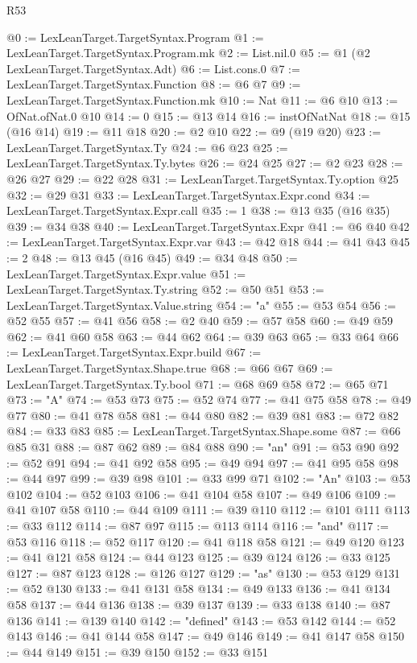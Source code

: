 \begin{lexlean}{R53}
\begin{coremodule}
@0 := LexLeanTarget.TargetSyntax.Program
@1 := LexLeanTarget.TargetSyntax.Program.mk
@2 := List.nil.{0}
@5 := @1 (@2 LexLeanTarget.TargetSyntax.Adt)
@6 := List.cons.{0}
@7 := LexLeanTarget.TargetSyntax.Function
@8 := @6 @7
@9 := LexLeanTarget.TargetSyntax.Function.mk
@10 := Nat
@11 := @6 @10
@13 := OfNat.ofNat.{0} @10
@14 := 0
@15 := @13 @14
@16 := instOfNatNat
@18 := @15 (@16 @14)
@19 := @11 @18
@20 := @2 @10
@22 := @9 (@19 @20)
@23 := LexLeanTarget.TargetSyntax.Ty
@24 := @6 @23
@25 := LexLeanTarget.TargetSyntax.Ty.bytes
@26 := @24 @25
@27 := @2 @23
@28 := @26 @27
@29 := @22 @28
@31 := LexLeanTarget.TargetSyntax.Ty.option @25
@32 := @29 @31
@33 := LexLeanTarget.TargetSyntax.Expr.cond
@34 := LexLeanTarget.TargetSyntax.Expr.call
@35 := 1
@38 := @13 @35 (@16 @35)
@39 := @34 @38
@40 := LexLeanTarget.TargetSyntax.Expr
@41 := @6 @40
@42 := LexLeanTarget.TargetSyntax.Expr.var
@43 := @42 @18
@44 := @41 @43
@45 := 2
@48 := @13 @45 (@16 @45)
@49 := @34 @48
@50 := LexLeanTarget.TargetSyntax.Expr.value
@51 := LexLeanTarget.TargetSyntax.Ty.string
@52 := @50 @51
@53 := LexLeanTarget.TargetSyntax.Value.string
@54 := "a"
@55 := @53 @54
@56 := @52 @55
@57 := @41 @56
@58 := @2 @40
@59 := @57 @58
@60 := @49 @59
@62 := @41 @60 @58
@63 := @44 @62
@64 := @39 @63
@65 := @33 @64
@66 := LexLeanTarget.TargetSyntax.Expr.build
@67 := LexLeanTarget.TargetSyntax.Shape.true
@68 := @66 @67
@69 := LexLeanTarget.TargetSyntax.Ty.bool
@71 := @68 @69 @58
@72 := @65 @71
@73 := "A"
@74 := @53 @73
@75 := @52 @74
@77 := @41 @75 @58
@78 := @49 @77
@80 := @41 @78 @58
@81 := @44 @80
@82 := @39 @81
@83 := @72 @82
@84 := @33 @83
@85 := LexLeanTarget.TargetSyntax.Shape.some
@87 := @66 @85 @31
@88 := @87 @62
@89 := @84 @88
@90 := "an"
@91 := @53 @90
@92 := @52 @91
@94 := @41 @92 @58
@95 := @49 @94
@97 := @41 @95 @58
@98 := @44 @97
@99 := @39 @98
@101 := @33 @99 @71
@102 := "An"
@103 := @53 @102
@104 := @52 @103
@106 := @41 @104 @58
@107 := @49 @106
@109 := @41 @107 @58
@110 := @44 @109
@111 := @39 @110
@112 := @101 @111
@113 := @33 @112
@114 := @87 @97
@115 := @113 @114
@116 := "and"
@117 := @53 @116
@118 := @52 @117
@120 := @41 @118 @58
@121 := @49 @120
@123 := @41 @121 @58
@124 := @44 @123
@125 := @39 @124
@126 := @33 @125
@127 := @87 @123
@128 := @126 @127
@129 := "as"
@130 := @53 @129
@131 := @52 @130
@133 := @41 @131 @58
@134 := @49 @133
@136 := @41 @134 @58
@137 := @44 @136
@138 := @39 @137
@139 := @33 @138
@140 := @87 @136
@141 := @139 @140
@142 := "defined"
@143 := @53 @142
@144 := @52 @143
@146 := @41 @144 @58
@147 := @49 @146
@149 := @41 @147 @58
@150 := @44 @149
@151 := @39 @150
@152 := @33 @151

\end{coremodule}
\end{lexlean}
